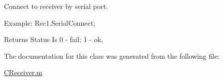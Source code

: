 Connect to receiver by serial port. 

Example\-: Rec1.\-Serial\-Connect; \begin{DoxyReturn}{Returns}
Status Is 0 -\/ fail; 1 -\/ ok. 
\end{DoxyReturn}


The documentation for this class was generated from the following file\-:\begin{DoxyCompactItemize}
\item 
\hyperlink{_c_receiver_8m}{C\-Receiver.\-m}\end{DoxyCompactItemize}
